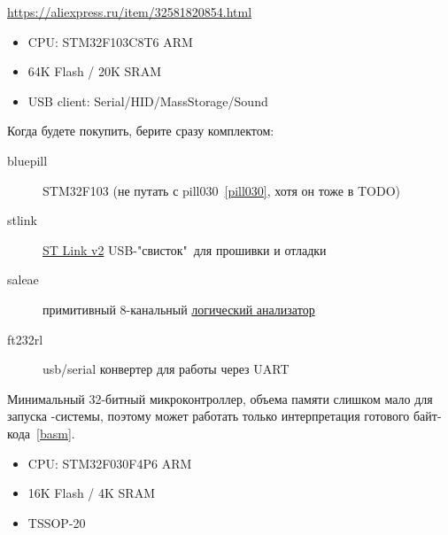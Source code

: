 \clearpage
{}\label{pill103}\secdown

\url{https://aliexpress.ru/item/32581820854.html}

\begin{itemize}[nosep]
    \item CPU: STM32F103C8T6 ARM 
    \item 64K Flash / 20K SRAM
    \item USB client: Serial/HID/MassStorage/Sound
\end{itemize}

\bigskip\noindent
Когда будете покупить, берите сразу комплектом:
\begin{description}
    \item[bluepill] STM32F103 (не путать с pill030\ \ref{pill030}, хотя он тоже в TODO)
    \item[stlink] \href{https://aliexpress.ru/item/32719963657.html}{ST Link v2}
    USB-"свисток"\ для прошивки и отладки
    \item[saleae] примитивный 8-канальный
    \href{https://aliexpress.ru/item/4000192339928.html}{логический анализатор}
    \item[ft232rl] usb/serial конвертер для работы через UART
\end{description}


\clearpage
{}

\secup

\clearpage
{}\label{pill030}\secdown

\noindent
Минимальный 32-битный микроконтроллер, объема памяти слишком мало для запуска
\F-системы, поэтому может работать только интерпретация готового байт-кода\
\ref{basm}.

\medskip
\begin{itemize}[nosep]
    \item CPU: STM32F030F4P6 ARM 
    \item 16K Flash / 4K SRAM
    \item TSSOP-20
\end{itemize}

\clearpage
{}

\secup
